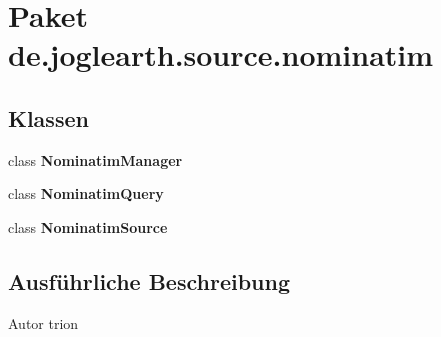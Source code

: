 \section{Paket de.\-joglearth.\-source.\-nominatim}
\label{namespacede_1_1joglearth_1_1source_1_1nominatim}
\subsection*{Klassen}
\begin{DoxyCompactItemize}
\item 
class {\bf Nominatim\-Manager}
\item 
class {\bf Nominatim\-Query}
\item 
class {\bf Nominatim\-Source}
\end{DoxyCompactItemize}


\subsection{Ausführliche Beschreibung}
\begin{DoxyAuthor}{Autor}
trion 
\end{DoxyAuthor}
